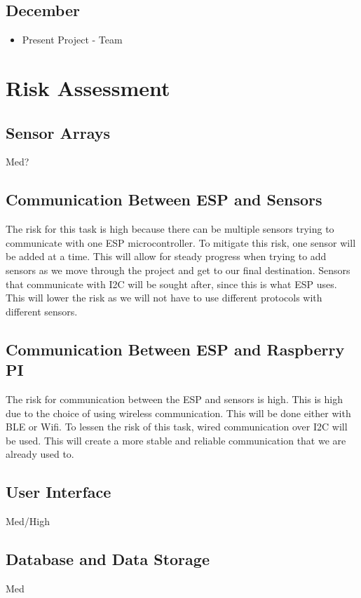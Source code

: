 \documentclass[letterpaper, 10 pt, conference]{ieeeconf}  %
\begin{document}
\subsection{December}
\begin{itemize}
    \item Present Project - Team
\end{itemize}

\section{Risk Assessment}
\subsection{Sensor Arrays}
Med?

\subsection{Communication Between ESP and Sensors}
The risk for this task is high because there can be multiple sensors trying to communicate with one ESP microcontroller. To mitigate this risk, one sensor will be added at a time. This will allow for steady progress when trying to add sensors as we move through the project and get to our final destination. Sensors that communicate with I2C will be sought after, since this is what ESP uses. This will lower the risk as we will not have to use different protocols with different sensors.

\subsection{Communication Between ESP and Raspberry PI}
The risk for communication between the ESP and sensors is high. This is high due to the choice of using wireless communication. This will be done either with BLE or Wifi. To lessen the risk of this task, wired communication over I2C will be used. This will create a more stable and reliable communication that we are already used to. 

\subsection{User Interface}
Med/High

\subsection{Database and Data Storage}
Med
\end{document}

